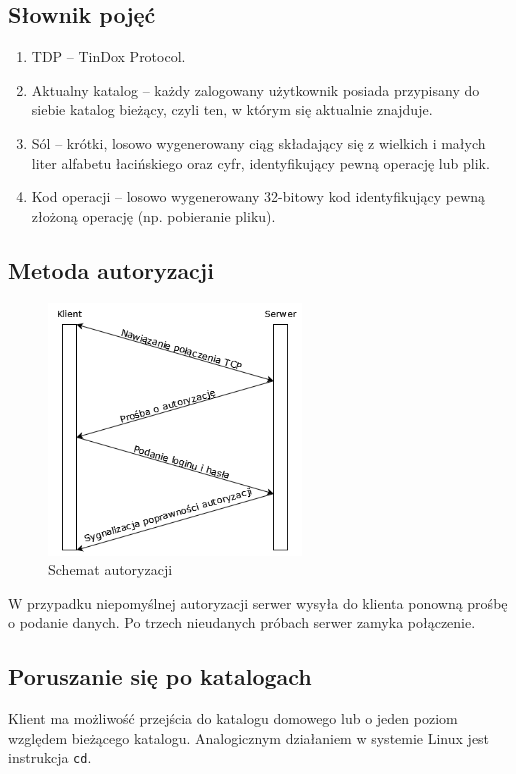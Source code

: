\documentclass[10pt,a4paper]{article}
\begin{document}
\subsection{Słownik pojęć}
\begin{enumerate}
    \item TDP -- TinDox Protocol.
    \item Aktualny katalog -- każdy zalogowany użytkownik posiada przypisany do siebie katalog bieżący, czyli ten, w którym się aktualnie znajduje.
    \item Sól -- krótki, losowo wygenerowany ciąg składający się z wielkich i małych liter alfabetu łacińskiego oraz cyfr, identyfikujący pewną operację lub plik.
    \item Kod operacji -- losowo wygenerowany 32-bitowy kod identyfikujący pewną złożoną operację (np. pobieranie pliku).
\end{enumerate}

\pagebreak
\subsection{Metoda autoryzacji}
\begin{figure}[ht]
\centering
\includegraphics[width=0.6\textwidth]{img/auth.png}
\caption{\label{fig:auth.png}Schemat autoryzacji}
\end{figure}
\FloatBarrier
W przypadku niepomyślnej autoryzacji serwer wysyła do klienta ponowną prośbę o podanie danych. Po trzech nieudanych próbach serwer zamyka połączenie.

\subsection{Poruszanie się po katalogach}
Klient ma możliwość przejścia do katalogu domowego lub o jeden poziom względem bieżącego katalogu. Analogicznym działaniem w systemie Linux jest instrukcja \texttt{cd}.
\end{document}
